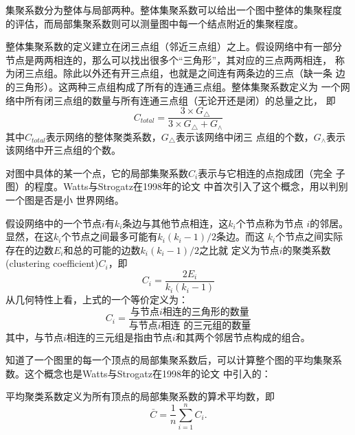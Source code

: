\documentclass[oneside, phd]{njuthesis}
\begin{document}
集聚系数分为整体与局部两种。整体集聚系数可以给出一个图中整体的集聚程度
的评估，而局部集聚系数则可以测量图中每一个结点附近的集聚程度。

\begin{definition}[整体聚类系数]
整体集聚系数的定义建立在闭三点组（邻近三点组）之上。假设网络中有一部分
节点是两两相连的，那么可以找出很多个“三角形”，其对应的三点两两相连，
称为闭三点组。除此以外还有开三点组，也就是之间连有两条边的三点（缺一条
  边的三角形）。这两种三点组构成了所有的连通三点组。整体集聚系数定义为
一个网络中所有闭三点组的数量与所有连通三点组（无论开还是闭）的总量之比，
即
\[
    C_{total}=\frac{3\times G_{\triangle}}{3 \times G_{\triangle} + G_{\wedge}}
\]
其中$C_{total}$表示网络的整体聚类系数，$G_{\triangle}$表示该网络中闭三
点组的个数，$G_{\wedge}$表示该网络中开三点组的个数\cite{luce1949method}。
\end{definition}

对图中具体的某一个点，它的局部集聚系数$C_i$表示与它相连的点抱成团（完全
  子图）的程度。Watts与Strogatz在1998年的论文
\cite{watts1998smallworld}中首次引入了这个概念，用以判别一个图是否是小
世界网络。

\begin{definition}[局部聚类系数]
假设网络中的一个节点$i$有$k_i$条边与其他节点相连，这$k_i$个节点称为节点
$i$的邻居。显然，在这$k_i$个节点之间最多可能有$k_i(k_i-1)/2$条边。而这
$k_i$个节点之间实际存在的边数$E_i$和总的可能的边数$k_i(k_i-1)/2$之比就
定义为节点$i$的聚类系数(clustering coefficient)$C_i$，即
\begin{equation}\label{eq:clustering_coefficient}
    C_i = \frac{2E_i}{k_i(k_i-1)}
\end{equation}
从几何特性上看，上式的一个等价定义为：
\begin{equation}\label{eq:clustering_coefficient_triangle}
    C_i = \frac{\text{与节点$i$相连的三角形的数量}}{\text{与节点$i$相连
        的三元组的数量}}
\end{equation}
其中，与节点$i$相连的三元组是指由节点$i$和其两个邻居节点构成的组合。
\end{definition}

知道了一个图里的每一个顶点的局部集聚系数后，可以计算整个图的平均集聚系
数。这个概念也是Watts与Strogatz在1998年的论文
\cite{watts1998smallworld}中引入的：

\begin{definition}[平均聚类系数]
平均聚类系数定义为所有顶点的局部集聚系数的算术平均数，即
\begin{equation}
    \bar{C} = \frac{1}{n}\sum_{i=1}^{n} C_i.
\end{equation}
\end{definition}
\end{document}
